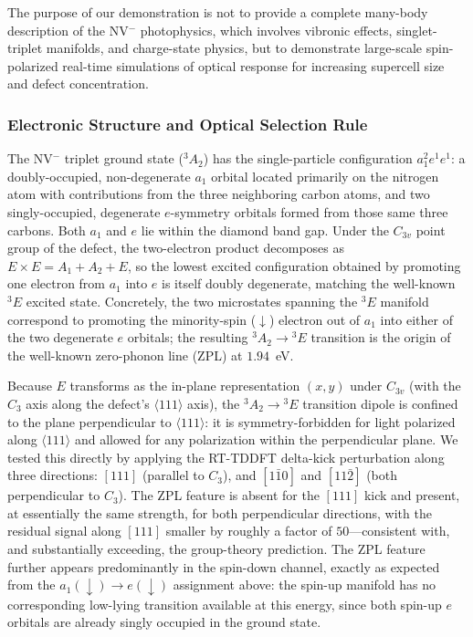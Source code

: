 The purpose of our demonstration is not to provide a complete
many-body description of the NV$^-$ photophysics, which involves
vibronic effects, singlet-triplet manifolds, and charge-state physics,
but to demonstrate large-scale spin-polarized real-time simulations of
optical response for increasing supercell size and defect
concentration.

\subsubsection{Electronic Structure and Optical Selection Rule}
\label{sec:nv-electronic-structure}

The NV$^-$ triplet ground state ($^3A_2$) has the single-particle
configuration $a_1^2 e^1 e^1$: a doubly-occupied, non-degenerate $a_1$
orbital located primarily on the nitrogen atom with contributions from
the three neighboring carbon atoms, and two singly-occupied, degenerate
$e$-symmetry orbitals formed from those same three carbons. Both $a_1$
and $e$ lie within the diamond band gap. Under the $C_{3v}$ point group
of the defect, the two-electron product decomposes as
$E\times E = A_1 + A_2 + E$, so the lowest excited configuration
obtained by promoting one electron from $a_1$ into $e$ is itself
doubly degenerate, matching the well-known $^3E$ excited state.
Concretely, the two microstates spanning the $^3E$ manifold correspond
to promoting the minority-spin ($\downarrow$) electron out of $a_1$
into either of the two degenerate $e$ orbitals; the resulting
$^3A_2\rightarrow{}^3E$ transition is the origin of the well-known
zero-phonon line (ZPL) at $1.94$~eV.\cite{NV-Gali-2008,NV-Gali-2019}

Because $E$ transforms as the in-plane representation $(x,y)$ under
$C_{3v}$ (with the $C_3$ axis along the defect's $\langle111\rangle$
axis), the $^3A_2\rightarrow{}^3E$ transition dipole is confined to the
plane perpendicular to $\langle111\rangle$: it is symmetry-forbidden
for light polarized along $\langle111\rangle$ and allowed for any
polarization within the perpendicular plane. We tested this directly
by applying the RT-TDDFT delta-kick perturbation along three
directions: $[111]$ (parallel to $C_3$), and $[1\bar{1}0]$ and
$[11\bar{2}]$ (both perpendicular to $C_3$). The ZPL feature is absent
for the $[111]$ kick and present, at essentially the same strength,
for both perpendicular directions, with the residual signal along
$[111]$ smaller by roughly a factor of $50$---consistent with, and
substantially exceeding, the group-theory prediction. The ZPL feature
further appears predominantly in the spin-down channel, exactly as
expected from the $a_1(\downarrow)\rightarrow e(\downarrow)$ assignment
above: the spin-up manifold has no corresponding low-lying transition
available at this energy, since both spin-up $e$ orbitals are already
singly occupied in the ground state.

